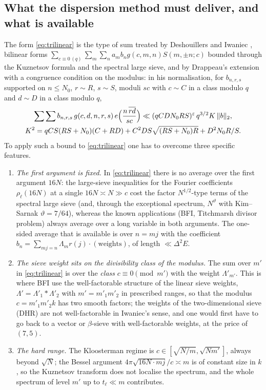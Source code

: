\documentclass[11pt,a4paper]{article}
\theoremstyle{remark}
\theoremstyle{definition}
\newcommand{\e}{\varepsilon}
\begin{document}
\subsection{What the dispersion method must deliver, and what is available}
The form \eqref{eq:trilinear} is the type of sum treated by Deshouillers and Iwaniec \cite[Theorems~9--12]{DI}, bilinear forms $\sum_{c\equiv0\,(q)}\sum_m\sum_na_mb_ng(c,m,n)S(m,\pm n;c)$ bounded through the Kuznetsov formula and the spectral large sieve, and by Drappeau's extension \cite[Theorem~2.1]{Drappeau} with a congruence condition on the modulus: in his normalisation, for $b_{n,r,s}$ supported on $n\le N_0$, $r\sim R$, $s\sim S$, moduli $sc$ with $c\sim C$ in a class modulo $q$ and $d\sim D$ in a class modulo $q$,
\begin{gather*}
\sum\sum b_{n,r,s}\,g(c,d,n,r,s)\,e\Bigl(\frac{n\,\overline{rd}}{sc}\Bigr)\ll(qCDN_0RS)^{\e}\,q^{3/2}K\,\|b\|_2,\\
K^2=qCS(RS+N_0)(C+RD)+C^2DS\sqrt{(RS+N_0)R}+D^2N_0R/S .
\end{gather*}
To apply such a bound to \eqref{eq:trilinear} one has to overcome three specific features.
\begin{enumerate}[label=\textup{(\alph*)},leftmargin=2.2em]
\item \emph{The first argument is fixed.} In \eqref{eq:trilinear} there is no average over the first argument $16N$: the large-sieve inequalities for the Fourier coefficients $\rho_\ell(16N)$ at a single $16N\asymp N\gg c$ cost the factor $N^{1/2}$-type terms of the spectral large sieve (and, through the exceptional spectrum, $N^{\vartheta}$ with Kim--Sarnak $\vartheta=7/64$), whereas the known applications (BFI, Titchmarsh divisor problem) always average over a long variable in both arguments. The one-sided average that is available is over $n=mj$ with the coefficient $b_n=\sum_{mj=n}\Lambda_mr(j)\cdot(\text{weights})$, of length $\ll\Delta^2E$.
\item \emph{The sieve weight sits on the divisibility class of the modulus.} The sum over $m'$ in \eqref{eq:trilinear} is over the \emph{class} $c\equiv0\pmod{m'}$ with the weight $\Lambda'_{m'}$. This is where BFI use the well-factorable structure of the linear sieve weights, $\Lambda'=\Lambda'_1*\Lambda'_2$ with $m'=m'_1m'_2$ in prescribed ranges, so that the modulus $c=m'_1m'_2k$ has two smooth factors; the weights of the two-dimensional sieve (DHR) are not well-factorable in Iwaniec's sense, and one would first have to go back to a vector or $\beta$-sieve with well-factorable weights, at the price of $(7,5)$.
\item \emph{The hard range.} The Kloosterman regime is $c\in[\sqrt{N/m},\sqrt{Nm'}]$, always beyond $\sqrt N$; the Bessel argument $4\pi\sqrt{16N\cdot mj}/c\asymp m$ is of constant size in $k$, so the Kuznetsov transform does not localise the spectrum, and the whole spectrum of level $m'$ up to $t_\ell\ll m$ contributes.
\end{enumerate}
\end{document}
